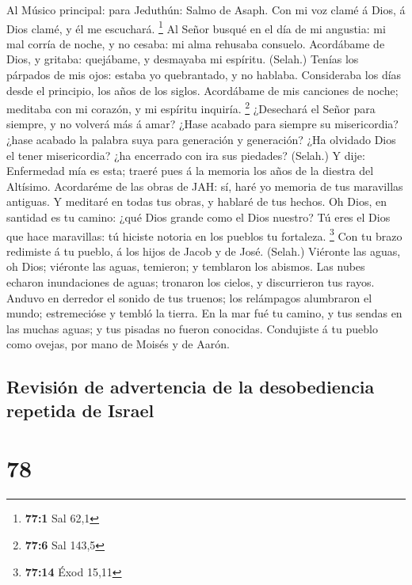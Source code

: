  Al Músico principal: para Jeduthún: Salmo de Asaph. Con mi
voz clamé á Dios, á Dios clamé, y él me escuchará. \footnote{\textbf{77:1}
  Sal 62,1}  Al Señor busqué en el día de mi angustia: mi
mal corría de noche, y no cesaba: mi alma rehusaba consuelo.
 Acordábame de Dios, y gritaba: quejábame, y desmayaba mi
espíritu. (Selah.)  Tenías los párpados de mis ojos: estaba
yo quebrantado, y no hablaba.  Consideraba los días desde el
principio, los años de los siglos.  Acordábame de mis
canciones de noche; meditaba con mi corazón, y mi espíritu inquiría.
\footnote{\textbf{77:6} Sal 143,5}  ¿Desechará el Señor para
siempre, y no volverá más á amar?  ¿Hase acabado para
siempre su misericordia? ¿hase acabado la palabra suya para generación y
generación?  ¿Ha olvidado Dios el tener misericordia? ¿ha
encerrado con ira sus piedades? (Selah.)  Y dije:
Enfermedad mía es esta; traeré pues á la memoria los años de la diestra
del Altísimo.  Acordaréme de las obras de JAH: sí, haré yo
memoria de tus maravillas antiguas.  Y meditaré en todas
tus obras, y hablaré de tus hechos.  Oh Dios, en santidad
es tu camino: ¿qué Dios grande como el Dios nuestro?  Tú
eres el Dios que hace maravillas: tú hiciste notoria en los pueblos tu
fortaleza. \footnote{\textbf{77:14} Éxod 15,11}  Con tu
brazo redimiste á tu pueblo, á los hijos de Jacob y de José. (Selah.)
 Viéronte las aguas, oh Dios; viéronte las aguas, temieron;
y temblaron los abismos.  Las nubes echaron inundaciones de
aguas; tronaron los cielos, y discurrieron tus rayos. 
Anduvo en derredor el sonido de tus truenos; los relámpagos alumbraron
el mundo; estremecióse y tembló la tierra.  En la mar fué
tu camino, y tus sendas en las muchas aguas; y tus pisadas no fueron
conocidas.  Condujiste á tu pueblo como ovejas, por mano de
Moisés y de Aarón.

\hypertarget{revisiuxf3n-de-advertencia-de-la-desobediencia-repetida-de-israel}{%
\subsection{Revisión de advertencia de la desobediencia repetida de
Israel}\label{revisiuxf3n-de-advertencia-de-la-desobediencia-repetida-de-israel}}

\hypertarget{section-77}{%
\section{78}\label{section-77}}

